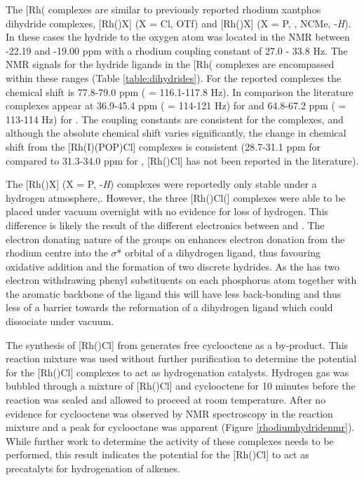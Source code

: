 The [Rh(\tBuxantphosk\ce{)Cl(H)2]} complexes are similar to previously reported rhodium xantphos dihydride complexes,  [Rh(\iPrxantphos)X] (X = Cl, OTf)\cite{Esteruelas2013} and [Rh(\Phxantphos)X] (X = P, , NCMe, -\dento{}\emph{H})\cite{Dallanegra2012, Johnson2013, Pawley2010}.   In these cases the hydride \trans{} to the oxygen atom was located in the \proton{} NMR between -22.19 and -19.00 ppm with a rhodium coupling constant of 27.0 - 33.8 Hz.  The \proton{} NMR signals for the hydride ligands in the [Rh(\tBuxantphosk\ce{)Cl(H)2]} complexes are encompassed within these ranges (Table \ref{table:dihydrides}).  For the reported \tBuxantphos{} complexes the \phosphorus{} chemical shift is 77.8-79.0 ppm (\JRhP{} = 116.1-117.8 Hz).  In comparison the literature complexes appear at 36.9-45.4 ppm (\JRhP{} = 114-121 Hz) for \Phxantphos{} and 64.8-67.2 ppm (\JRhP{} = 113-114 Hz) for \iPrxantphos{}.  The coupling constants are consistent for the complexes, and although the absolute chemical shift varies significantly, the change in chemical shift from the [Rh(I)(POP)Cl] complexes is consistent (28.7-31.1 ppm for \iPrxantphos{} compared to 31.3-34.0 ppm for \tBuxantphos{}, [Rh(\Phxantphos)Cl] has not been reported in the literature).  

The [Rh(\Phxantphos)X] (X = P, -\dento{}\emph{H}) complexes were reportedly only stable under a hydrogen atmosphere,\cite{Johnson2013, Dallanegra2012}.  However, the three [Rh(\tBuxantphos)Cl(] complexes were able to be placed under vacuum overnight with no evidence for loss of hydrogen.  This difference is likely the result of the different electronics between \tBuxantphos{} and \Phxantphos{}.  The electron donating nature of the \tBu{} groups on \tBuxantphos{} enhances electron donation from the rhodium centre into the $\sigma$* orbital of a dihydrogen ligand, thus favouring oxidative addition and the formation of two discrete hydrides.  As the \Phxantphos{} has two electron withdrawing phenyl substituents on each phosphorus atom together with the aromatic backbone of the ligand this will have less back-bonding and thus less of a barrier towards the reformation of a dihydrogen ligand which could dissociate under vacuum.

The synthesis of [Rh(\tBuxantphosk)Cl] from  generates free cyclooctene as a by-product.  This reaction mixture was used without further purification to determine the potential for the [Rh(\tBuxantphosk)Cl] complexes to act as hydrogenation catalysts.  Hydrogen gas was bubbled through a mixture of [Rh(\tBuxantphosk)Cl] and cyclooctene for 10 minutes before the reaction was sealed and allowed to proceed at room temperature.  After  no evidence for cyclooctene was observed by \proton{} NMR spectroscopy in the reaction mixture and a peak for cyclooctane was apparent (Figure \ref{rhodiumhydridenmr}).  While further work to determine the activity of these complexes needs to be performed, this result indicates the potential for the [Rh(\tBuxantphosk)Cl] to act as precatalyts for hydrogenation of alkenes.  

